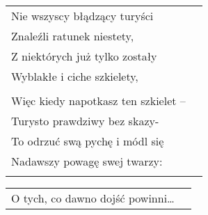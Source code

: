 \documentclass[a5paper]{article}
\begin{document}
\noindent
\begin{tabular}{@{}p{8.5cm}p{3cm}@{}}
Nie wszyscy błądzący turyści\\
Znaleźli ratunek niestety,\\
Z niektórych już tylko zostały\\
Wyblakłe i ciche szkielety,\\\\

Więc kiedy napotkasz ten szkielet – \\
Turysto prawdziwy bez skazy-\\
To odrzuć swą pychę i módl się\\
Nadawszy powagę swej twarzy: \\ \\
\end{tabular}

\noindent
\begin{tabular}{@{}p{8.5cm}p{3cm}@{}}
O tych, co dawno dojść powinni…
\end{tabular}
\end{document}
